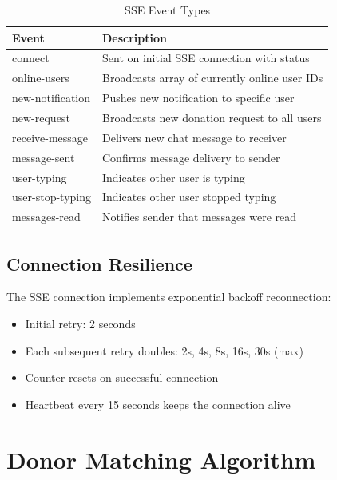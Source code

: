 \documentclass[12pt,a4paper]{article}
\begin{document}
\begin{table}[H]
\centering
\renewcommand{\arraystretch}{1.3}
\begin{tabularx}{\textwidth}{|l|X|}
    \hline
    \textbf{Event} & \textbf{Description} \\
    \hline
    connect & Sent on initial SSE connection with status \\
    \hline
    online-users & Broadcasts array of currently online user IDs \\
    \hline
    new-notification & Pushes new notification to specific user \\
    \hline
    new-request & Broadcasts new donation request to all users \\
    \hline
    receive-message & Delivers new chat message to receiver \\
    \hline
    message-sent & Confirms message delivery to sender \\
    \hline
    user-typing & Indicates other user is typing \\
    \hline
    user-stop-typing & Indicates other user stopped typing \\
    \hline
    messages-read & Notifies sender that messages were read \\
    \hline
\end{tabularx}
\caption{SSE Event Types}
\end{table}

\subsection{Connection Resilience}

The SSE connection implements exponential backoff reconnection:
\begin{itemize}[leftmargin=*]
    \item Initial retry: 2 seconds
    \item Each subsequent retry doubles: 2s, 4s, 8s, 16s, 30s (max)
    \item Counter resets on successful connection
    \item Heartbeat every 15 seconds keeps the connection alive
\end{itemize}

\section{Donor Matching Algorithm}
\end{document}

